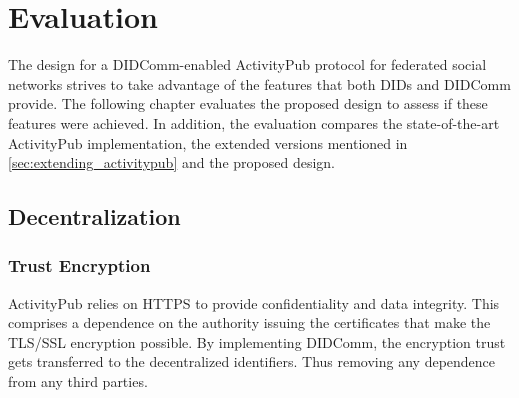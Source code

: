 \chapter{Evaluation}
\label{cha:evaluation}


The design for a DIDComm-enabled ActivityPub protocol for federated social networks strives to take advantage of the features that both DIDs and DIDComm provide. The following chapter evaluates the proposed design to assess if these features were achieved. In addition, the evaluation compares the state-of-the-art ActivityPub implementation, the extended versions mentioned in \ref{sec:extending_activitypub} and the proposed design.

\section{Decentralization}
\subsection{Trust Encryption}
ActivityPub relies on HTTPS to provide confidentiality and data integrity. This comprises a dependence on the authority issuing the certificates that make the TLS/SSL encryption possible. By implementing DIDComm, the encryption trust gets transferred to the decentralized identifiers. Thus removing any dependence from any third parties. 

